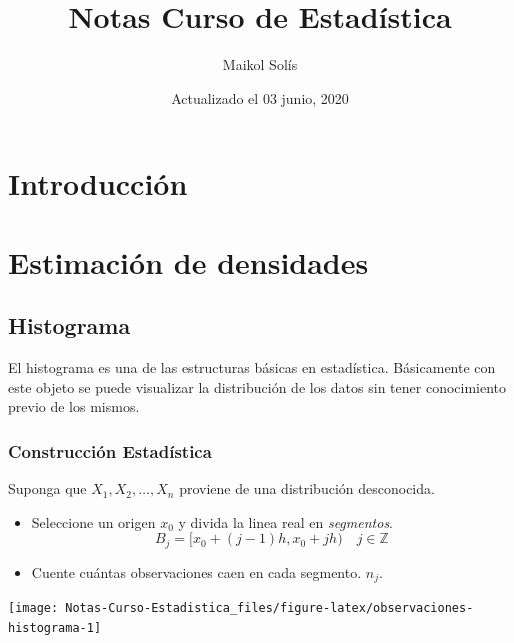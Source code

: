 \documentclass[
  12pt,
]{book}
\title{Notas Curso de Estadística}
\author{Maikol Solís}
\date{Actualizado el 03 junio, 2020}
\theoremstyle{definition}
\theoremstyle{definition}
\theoremstyle{definition}
\theoremstyle{remark}
\begin{document}
\maketitle

{
\hypersetup{linkcolor=}
\setcounter{tocdepth}{4}
\tableofcontents
}
\hypertarget{introducciuxf3n}{%
\chapter{Introducción}\label{introducciuxf3n}}

\hypertarget{estimaciuxf3n-de-densidades}{%
\chapter{Estimación de densidades}\label{estimaciuxf3n-de-densidades}}

\hypertarget{histograma}{%
\section{Histograma}\label{histograma}}

El histograma es una de las estructuras básicas en estadística. Básicamente con este objeto se puede visualizar la distribución de los datos sin tener conocimiento previo de los mismos.

\hypertarget{construcciuxf3n-estaduxedstica}{%
\subsection{Construcción Estadística}\label{construcciuxf3n-estaduxedstica}}

Suponga que \(X_1,X_2, \dots ,X_n\) proviene de una distribución desconocida.

\begin{itemize}
\item
  Seleccione un origen \(x_0\) y divida la linea real en \emph{segmentos}.
  \begin{equation*}
  B_j = [x_0 +(j - 1)h,x_0 + jh) \quad j\in \mathbb{Z}
  \end{equation*}
\item
  Cuente cuántas observaciones caen en cada segmento. \(n_j\).
\end{itemize}

\begin{center}\texttt{[image: Notas-Curso-Estadistica\_files/figure-latex/observaciones-histograma-1]} \end{center}
\end{document}
